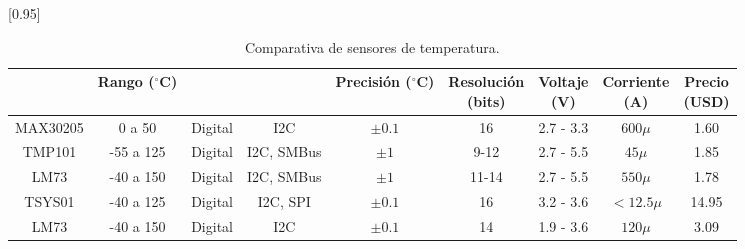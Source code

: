 		\begin{table}[htbp]
			\begin{center}
			\scalebox{0.85}[0.95]{
			\begin{tabular}{|c|c|c|c|c|c|c|c|c|}
				\hline
				\thead{Modelo}&\thead{Rango \\ ($^{\circ}$C)}&\thead{Tipo}&\thead{Interfaz}&\thead{Precisión \\ ($^{\circ}$C)}&\thead{Resolución \\ (bits)}&\thead{Voltaje \\ (V)}&\thead{Corriente \\ (A)}&\thead{Precio \\ (USD)}\\
				\hline
				\hline
				MAX30205 & 0 a 50 & Digital& I2C& $\pm0.1$ &16 & 2.7 - 3.3&$600\mu$&1.60 \\
				\hline
				TMP101 & -55 a 125 & Digital& I2C, SMBus& $\pm1$ &9-12 & 2.7 - 5.5&$45\mu$&1.85 \\
				\hline
				LM73 & -40 a 150 & Digital& I2C, SMBus& $\pm1$ &11-14 & 2.7 - 5.5&$550\mu$&1.78 \\
				\hline
				TSYS01 & -40 a 125 & Digital& I2C, SPI& $\pm0.1$ &16 & 3.2 - 3.6&$< 12.5\mu$&14.95 \\
				\hline
				LM73 & -40 a 150 & Digital& I2C& $\pm0.1$ &14 & 1.9 - 3.6&$120\mu$&3.09 \\
				\hline
			\end{tabular}}
			\caption{Comparativa de sensores de temperatura.}
			\label{analisis:sensorTemperatura}
			\end{center}
		\end{table}
